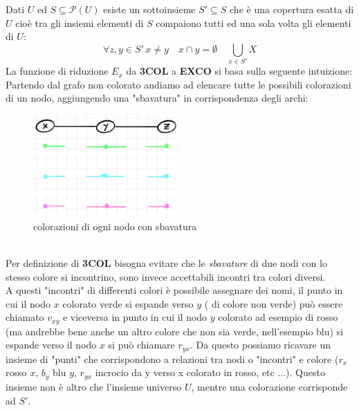 \documentclass[a4paper]{article}
\begin{document}
Dati $U$ ed $S \subseteq \mathcal{P}(U)$ esiste un sottoinsieme $S' \subseteq S$ che è una copertura esatta di $U$ cioè tra gli insiemi elementi di $S$ compaiono tutti ed una sola volta gli elementi di $U$:
$$\forall z,y \in S'\, x \neq y \quad x \cap y = \emptyset \quad \bigcup_{x \in S'}X $$
La funzione di riduzione $E_x$ da \textbf{3COL} a \textbf{EXCO} si basa sulla seguente intuizione:\\
Partendo dal grafo non colorato andiamo ad elencare tutte le possibili colorazioni di un nodo, aggiungendo una "sbavatura" in corrispondenza degli archi:
\begin{figure}[!ht]
                \centering
                \includegraphics[width = 0.5\textwidth]{./img/E11_sbavatura.png}
                \caption{colorazioni di ogni nodo con sbavatura} \label{FIG:E11_sbavatura}
\end{figure}\\
Per definizione di \textbf{3COL} bisogna evitare che le \textit{sbavature} di due nodi con lo stesso colore si incontrino, sono invece accettabili incontri tra colori diversi.\\
A questi "incontri" di differenti colori è possibile assegnare dei nomi, il punto in cui il nodo $x$ colorato verde si espande verso $y$ ( di colore non verde) può essere chiamato $v_{xy}$ e viceversa in punto in cui il nodo $y$ colorato ad esempio di rosso (ma andrebbe bene anche un altro colore che non sia verde, nell'esempio blu) si espande verso il nodo $x$ si può chiamare $r_{yx}$.
Da questo possiamo ricavare un insieme di "punti" che corrispondono a relazioni tra nodi o "incontri" e colore ($r_x$ rosso $x$, $b_y$ blu $y$, $r_{yx}$ incrocio da y verso x colorato in rosso, etc ...).
Questo insieme non è altro che l'insieme universo $U$, mentre una colorazione corrisponde ad $S'$.
\end{document}
